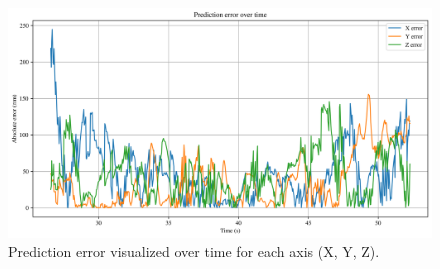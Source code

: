 \documentclass[]{spie}  %
\begin{document}
	\begin{figure}[H]
		\centering
		\includegraphics[width=6.5in]{figures/Figure6_Error_Over_Time}
		\caption{Prediction error visualized over time for each axis (X, Y, Z).}
		\label{fig:Figure6_Error_Over_Time}
	\end{figure}
	
	\lipsum[1-2]
	
	
\end{document}
